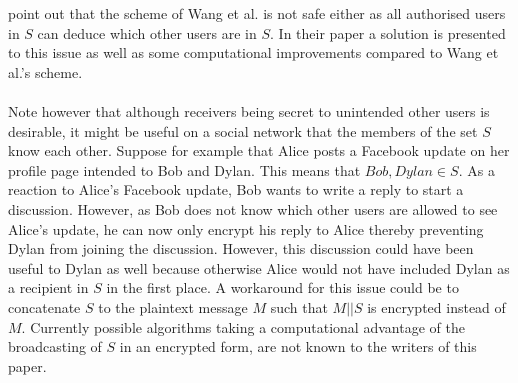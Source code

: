 \documentclass[journal]{IEEEtran}
\begin{document}
point out that the scheme of Wang et al. is not safe either as all authorised
users in $S$ can deduce which other users are in $S$. In their paper a
solution is presented to this issue as well as some computational improvements
compared to Wang et al.'s scheme.\\
\\
Note however that although receivers being secret to unintended other users is
desirable, it might be useful on a social network that the members of the set
$S$ know each other. Suppose for example that Alice posts a Facebook update on
her profile page intended to Bob and Dylan. This means that $Bob, Dylan \in S$.
As a reaction to Alice's Facebook update, Bob wants to write a reply to start a
discussion. However, as Bob does not know which other users are allowed to see
Alice's update, he can now only encrypt his reply to Alice thereby preventing
Dylan from joining the discussion. However, this discussion could have been
useful to Dylan as well because otherwise Alice would not have included Dylan
as a recipient in $S$ in the first place. A workaround for this issue could be
to concatenate $S$ to the plaintext message $M$ such that $M || S$ is encrypted
instead of $M$. Currently possible algorithms taking a computational advantage
of the broadcasting of $S$ in an encrypted form, are not known to the writers
of this paper.
\end{document}
